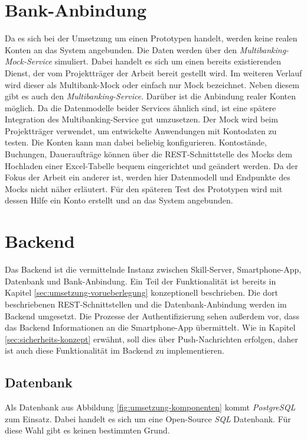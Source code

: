 \section{Bank-Anbindung}
\label{sec:bankkonto-anbindung}
Da es sich bei der Umsetzung um einen Prototypen handelt, werden keine realen Konten an das System angebunden. Die Daten werden über den \textit{Multibanking-Mock-Service} simuliert. Dabei handelt es sich um einen bereits existierenden Dienst, der vom Projektträger der Arbeit bereit gestellt wird. Im weiteren Verlauf wird dieser als Multibank-Mock oder einfach nur Mock bezeichnet. Neben diesem gibt es auch den \textit{Multibanking-Service}. Darüber ist die Anbindung realer Konten möglich. Da die Datenmodelle beider Services ähnlich sind, ist eine spätere Integration des Multibanking-Service gut umzusetzen. Der Mock wird beim Projektträger verwendet, um entwickelte Anwendungen mit Kontodaten zu testen. Die Konten kann man dabei beliebig konfigurieren. Kontostände, Buchungen, Daueraufträge \usw können über die \ac{REST}-Schnittstelle des Mocks \bzw dem Hochladen einer Excel-Tabelle bequem eingerichtet und geändert werden. Da der Fokus der Arbeit ein anderer ist, werden hier Datenmodell und Endpunkte des Mocks nicht näher erläutert. Für den späteren Test des Prototypen wird mit dessen Hilfe ein Konto erstellt und an das System angebunden.

\section{Backend}
\label{sec:backend}
Das Backend ist die vermittelnde Instanz zwischen Skill-Server, Smartphone-App, Datenbank und Bank-Anbindung. Ein Teil der Funktionalität ist bereits in Kapitel \ref{sec:umsetzung-vorueberlegung} konzeptionell beschrieben. Die dort beschriebenen \ac{REST}-Schnittstellen und die Datenbank-Anbindung werden im Backend umgesetzt. Die Prozesse der Authentifizierung sehen außerdem vor, dass das Backend Informationen an die Smartphone-App übermittelt. Wie in Kapitel \ref{sec:sicherheits-konzept} erwähnt, soll dies über Push-Nachrichten erfolgen, daher ist auch diese Funktionalität im Backend zu implementieren. 

\subsection{Datenbank}
\label{subsec:backend-datenbank}
Als Datenbank aus Abbildung \ref{fig:umsetzung-komponenten} kommt \textit{PostgreSQL} \cite{postgres} zum Einsatz. Dabei handelt es sich um eine Open-Source \textit{\ac{SQL}} Datenbank. Für diese Wahl gibt es keinen bestimmten Grund.

